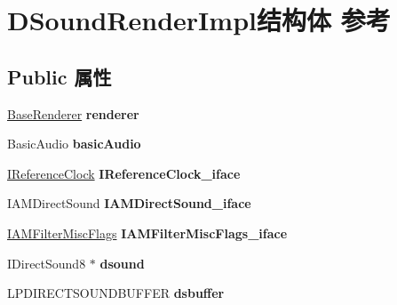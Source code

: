 \hypertarget{struct_d_sound_render_impl}{}\section{D\+Sound\+Render\+Impl结构体 参考}
\label{struct_d_sound_render_impl}
\subsection*{Public 属性}
\begin{DoxyCompactItemize}
\item 
\mbox{\label{struct_d_sound_render_impl_aed036b0e52a39515f136bc77e2a2873a}} 
\hyperlink{struct_base_renderer_tag}{Base\+Renderer} {\bfseries renderer}
\item 
\mbox{\label{struct_d_sound_render_impl_a9f5e227da5a6a259385413397e994cb7}} 
Basic\+Audio {\bfseries basic\+Audio}
\item 
\mbox{\label{struct_d_sound_render_impl_a55d5d5c360607517f4d6ab29e9af6573}} 
\hyperlink{interface_i_reference_clock}{I\+Reference\+Clock} {\bfseries I\+Reference\+Clock\+\_\+iface}
\item 
\mbox{\label{struct_d_sound_render_impl_ac7891bf5698bd8c265ddb7f53f6648e6}} 
I\+A\+M\+Direct\+Sound {\bfseries I\+A\+M\+Direct\+Sound\+\_\+iface}
\item 
\mbox{\label{struct_d_sound_render_impl_a118ec8deb03d39d88ff6290453df76c4}} 
\hyperlink{interface_i_a_m_filter_misc_flags}{I\+A\+M\+Filter\+Misc\+Flags} {\bfseries I\+A\+M\+Filter\+Misc\+Flags\+\_\+iface}
\item 
\mbox{\label{struct_d_sound_render_impl_a6d07ac479aaad23508f822e08585d847}} 
I\+Direct\+Sound8 $\ast$ {\bfseries dsound}
\item 
\mbox{\label{struct_d_sound_render_impl_a2feaeea75a6836a136a89d26bf9d2dc9}} 
L\+P\+D\+I\+R\+E\+C\+T\+S\+O\+U\+N\+D\+B\+U\+F\+F\+ER {\bfseries dsbuffer}
\item 
\mbox{\label{struct_d_sound_render_impl_a820a1ce2e53f32a69e80f9eecd09e830}} 

\end{DoxyCompactItemize}
